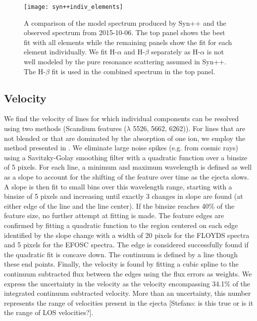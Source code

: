 \documentclass[preprint]{aastex61}
\newcommand{\stefanocomment}[1]{{\color{cyan} [{#1}]}}
\newcommand{\Stefano}[1]{\stefanocomment{Stefano: #1}}
\begin{document}
\begin{figure}[htbp]
\begin{center}
\texttt{[image: syn++indiv\_elements]} %
\caption{A comparison of the model spectrum produced by Syn++ and the observed spectrum from 2015-10-06.
The top panel shows the best fit with all elements while the remaining panels show the fit for each element individually.
We fit H-$\alpha$ and H-$\beta$ separately as H-$\alpha$ is not well modeled by the pure resonance scattering assumed in Syn++.
The H-$\beta$ fit is used in the combined spectrum in the top panel.}
\label{fig:syn++}
\end{center}
\end{figure}
\subsection{Velocity}
We find the velocity of lines for which individual components can be resolved using two methods (Scandium features ($\lambda$ 5526, 5662, 6262)).
For lines that are not blended or that are dominated by the absorption of one ion, we employ the method presented in \citet{2012silverman}. 
We eliminate large noise spikes (e.g. from cosmic rays) using a Savitzky-Golay smoothing filter \citep{1964savitzky} with a quadratic function over a binsize of 5 pixels. 
For each line, a minimum and maximum wavelength is defined as well as a slope to account for the shifting of the feature over time as the ejecta slows. 
A slope is then fit to small bins over this wavelength range, starting with a binsize of 5 pixels and increasing until exactly 3 changes in slope are found (at either edge of the line and the line center). 
If the binsize reaches 40\% of the feature size, no further attempt at fitting is made. 
The feature edges are confirmed by fitting a quadratic function to the region centered on each edge identified by the slope change with a width of 20 pixels for the FLOYDS spectra and 5 pixels for the EFOSC spectra. 
The edge is considered successfully found if the quadratic fit is concave down. 
The continuum is defined by a line though these end points.
Finally, the velocity is found by fitting a cubic spline to the continuum subtracted flux between the edges using the flux errors as weights. 
We express the uncertainty in the velocity as the velocity encompassing 34.1\% of the integrated continuum subtracted velocity.
More than an uncertainty, this number represents the range of velocities present in the ejecta \Stefano{is this true or is it the range of LOS velocities?}.
\end{document}
